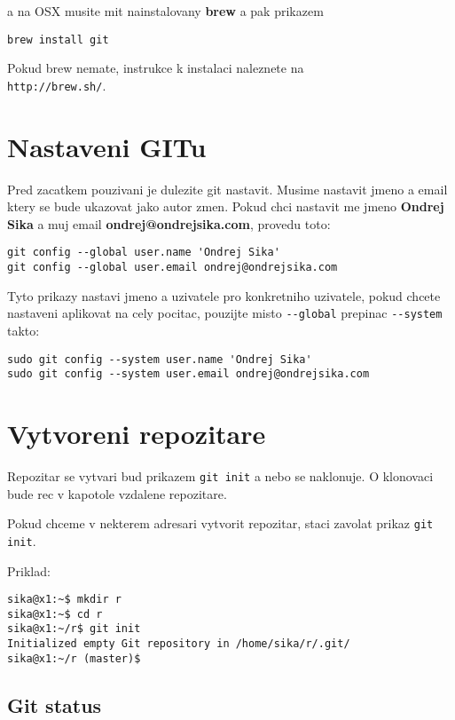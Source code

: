 \documentclass[12pt,a5paper]{article}
\begin{document}
a na OSX musite mit nainstalovany {\bf brew} a pak prikazem

\begin{lstlisting}
brew install git
\end{lstlisting}

Pokud brew nemate, instrukce k instalaci naleznete na \\
\lstinline|http://brew.sh/|.

\section{Nastaveni GITu}

Pred zacatkem pouzivani je dulezite git nastavit. Musime nastavit jmeno a email ktery se bude ukazovat jako autor zmen. Pokud chci nastavit me jmeno {\bf Ondrej Sika} a muj email {\bf ondrej@ondrejsika.com}, provedu toto:

\begin{lstlisting}
git config --global user.name 'Ondrej Sika'
git config --global user.email ondrej@ondrejsika.com
\end{lstlisting}

Tyto prikazy nastavi jmeno a uzivatele pro konkretniho uzivatele, pokud chcete nastaveni aplikovat na cely pocitac, pouzijte misto \lstinline|--global| prepinac \lstinline|--system| takto:

\begin{lstlisting}
sudo git config --system user.name 'Ondrej Sika'
sudo git config --system user.email ondrej@ondrejsika.com
\end{lstlisting}

\section{Vytvoreni repozitare}

Repozitar se vytvari bud prikazem \lstinline|git init| a nebo se naklonuje. O klonovaci bude rec v kapotole vzdalene repozitare.

Pokud chceme v nekterem adresari vytvorit repozitar, staci zavolat prikaz \lstinline|git init|.

Priklad:

\begin{lstlisting}
sika@x1:~$ mkdir r
sika@x1:~$ cd r
sika@x1:~/r$ git init
Initialized empty Git repository in /home/sika/r/.git/
sika@x1:~/r (master)$
\end{lstlisting}

\subsection{Git status}
\end{document}

